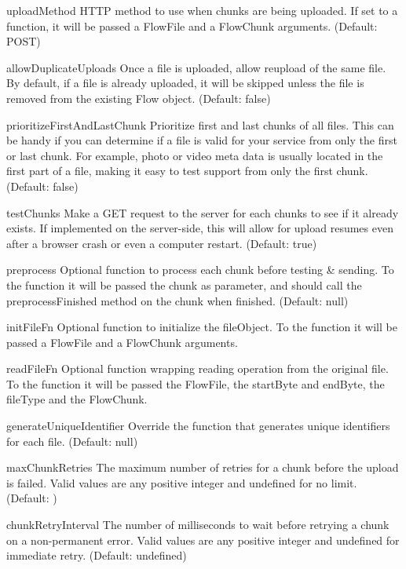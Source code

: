 \begin{DoxyItemize}
\item {\ttfamily upload\+Method} H\+T\+TP method to use when chunks are being uploaded. If set to a function, it will be passed a Flow\+File and a Flow\+Chunk arguments. (Default\+: {\ttfamily P\+O\+ST})
\item {\ttfamily allow\+Duplicate\+Uploads} Once a file is uploaded, allow reupload of the same file. By default, if a file is already uploaded, it will be skipped unless the file is removed from the existing Flow object. (Default\+: {\ttfamily false})
\item {\ttfamily prioritize\+First\+And\+Last\+Chunk} Prioritize first and last chunks of all files. This can be handy if you can determine if a file is valid for your service from only the first or last chunk. For example, photo or video meta data is usually located in the first part of a file, making it easy to test support from only the first chunk. (Default\+: {\ttfamily false})
\item {\ttfamily test\+Chunks} Make a G\+ET request to the server for each chunks to see if it already exists. If implemented on the server-\/side, this will allow for upload resumes even after a browser crash or even a computer restart. (Default\+: {\ttfamily true})
\item {\ttfamily preprocess} Optional function to process each chunk before testing \& sending. To the function it will be passed the chunk as parameter, and should call the {\ttfamily preprocess\+Finished} method on the chunk when finished. (Default\+: {\ttfamily null})
\item {\ttfamily init\+File\+Fn} Optional function to initialize the file\+Object. To the function it will be passed a Flow\+File and a Flow\+Chunk arguments.
\item {\ttfamily read\+File\+Fn} Optional function wrapping reading operation from the original file. To the function it will be passed the Flow\+File, the start\+Byte and end\+Byte, the file\+Type and the Flow\+Chunk.
\item {\ttfamily generate\+Unique\+Identifier} Override the function that generates unique identifiers for each file. (Default\+: {\ttfamily null})
\item {\ttfamily max\+Chunk\+Retries} The maximum number of retries for a chunk before the upload is failed. Valid values are any positive integer and {\ttfamily undefined} for no limit. (Default\+: {})
\item {\ttfamily chunk\+Retry\+Interval} The number of milliseconds to wait before retrying a chunk on a non-\/permanent error. Valid values are any positive integer and {\ttfamily undefined} for immediate retry. (Default\+: {\ttfamily undefined})

\end{DoxyItemize}
